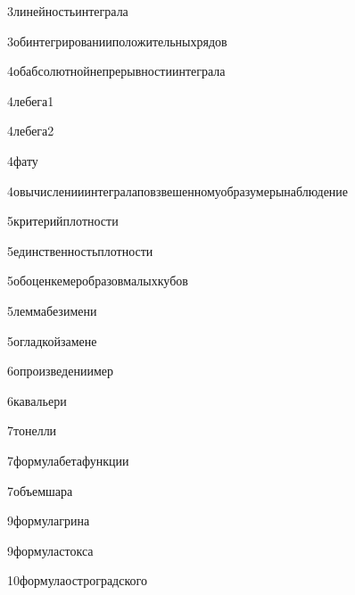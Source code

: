 {3}{линейностьинтеграла}

{3}{обинтегрированииположительныхрядов}

{4}{обабсолютнойнепрерывностиинтеграла}

{4}{лебега1}

{4}{лебега2}

{4}{фату}

{4}{овычисленииинтегралаповзвешенномуобразумерынаблюдение}

{5}{критерийплотности}

{5}{единственностьплотности}

{5}{обоценкемеробразовмалыхкубов}

{5}{леммабезимени}

{5}{огладкойзамене}

{6}{опроизведениимер}

{6}{кавальери}

{7}{тонелли}

{7}{формулабетафункции}

{7}{объемшара}

{9}{формулагрина}

{9}{формуластокса}

{10}{формулаостроградского}

